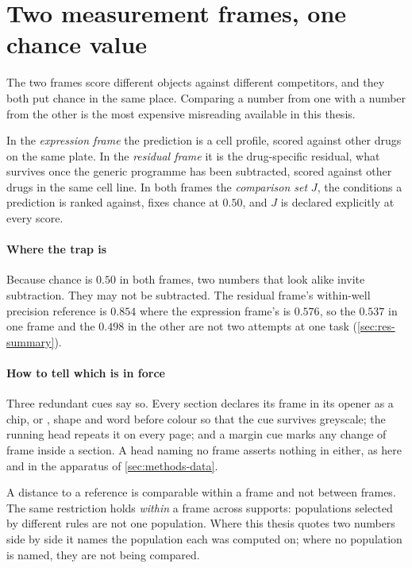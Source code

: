 \section*{Two measurement frames, one chance value}

\noindent
The two frames score different objects against different competitors, and they
both put chance in the same place. Comparing a number from one with a number
from the other is the most expensive misreading available in this
thesis.

In the \Eframe{} \emph{expression frame} the prediction is a cell profile,
scored against other drugs on the same plate. In the \Rframe{} \emph{residual
frame} it is the drug-specific residual, what survives once the generic
programme has been subtracted, scored against other drugs in the same cell
line. In both frames the \emph{comparison set} $J$, the conditions a prediction
is ranked against, fixes chance at $0.50$, and $J$ is declared explicitly at
every score.

\paragraph{Where the trap is} Because chance is $0.50$ in both frames, two
numbers that look alike invite subtraction. They may not be subtracted.
The residual frame's within-well precision reference is $0.854$
where the expression frame's is $0.576$, so the $0.537$ in one frame and the
$0.498$ in the other are not two attempts at one task
(\cref{sec:res-summary}).

\paragraph{How to tell which is in force} Three redundant cues say so. Every
section declares its frame in its opener as a chip, \Eframe{} or
\Rframe{}, shape and word before colour so that the cue survives greyscale; the
running head repeats it on every page; and a margin cue marks any change of
frame inside a section. A head naming no frame asserts nothing in either, as
here and in the apparatus of \cref{sec:methods-data}.

%
\begin{scopelimit}
A distance to a reference is comparable within a frame and not between frames.
The same restriction holds \emph{within} a frame across
supports: populations selected by different rules are not one population. Where
this thesis quotes two numbers side by side it names the population each was
computed on; where no population is named, they are not being compared.
\end{scopelimit}

